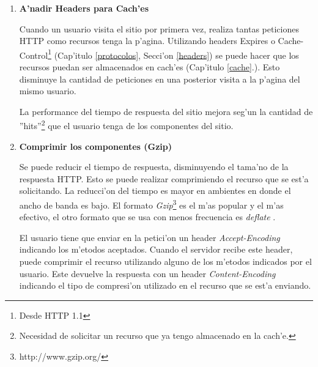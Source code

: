 \begin{enumerate}
La proximidad del cliente al servidor web tiene un impacto en el tiempo de respuesta de las peticiones. No es lo mismo solicitar un recurso localizado en China estando en Argentina que uno ubicado dentro del mismo pa'is. Por ende, si los contenidos est'an cerca\footnote{En t'erminos de distancia f'isica.} el tiempo de respuesta es menor. Debido a que solo el 10-20\% del tiempo de respuesta se dedica al HTML (visto al inicio de este cap'itulo), si el resto de los recursos del sitio se encuentran cerca del cliente, se mejorar'ian los tiempos de respuesta. Para esto es necesario dispersar estos recursos geogr'aficamente.

Un CDN es una red de distribuci'on de contenidos. Son servidores dispersados geogr'aficamente que ofrecen r'eplicas de los recursos de un sitio particular para brindarlos al cliente desde el m'as cercano a su locaci'on.

Utilizar el servicio que brinda un CDN mejora los tiempos de respuesta de los usuarios.
\item \textbf{A'nadir Headers para Cach'es}

Cuando un usuario visita el sitio por primera vez, realiza tantas peticiones HTTP como recursos tenga la p'agina. Utilizando headers Expires o Cache-Control\footnote{Desde HTTP 1.1} (Cap'itulo \ref{protocolos}, Secci'on \ref{headers}) se puede hacer que los recursos puedan ser almacenados en cach'es (Cap'itulo \ref{cache}.). Esto disminuye la cantidad de peticiones en una posterior visita a la p'agina del mismo usuario.

La performance del tiempo de respuesta del sitio mejora seg'un la cantidad de ''hits''\footnote{Necesidad de solicitar un recurso que ya tengo almacenado en la cach'e.} que el usuario tenga de los componentes del sitio.
\item \textbf{Comprimir los componentes (Gzip)}

Se puede reducir el tiempo de respuesta, disminuyendo el tama'no de la respuesta HTTP. Esto se puede realizar comprimiendo el recurso que se est'a solicitando. La reducci'on del tiempo es mayor en ambientes en donde el ancho de banda es bajo. El formato \textit{Gzip}\footnote{http://www.gzip.org/} \citep{rfcGzip} es el m'as popular y el m'as efectivo, el otro formato que se usa con menos frecuencia es \textit{deflate} \citep{rfcDeflate}.

El usuario tiene que enviar en la petici'on un header \textit{Accept-Encoding} indicando los m'etodos aceptados. Cuando el servidor recibe este header, puede comprimir el recurso utilizando alguno de los m'etodos indicados por el usuario. Este devuelve la respuesta con un header \textit{Content-Encoding} indicando el tipo de compresi'on utilizado en el recurso que se est'a enviando.


\end{enumerate}
